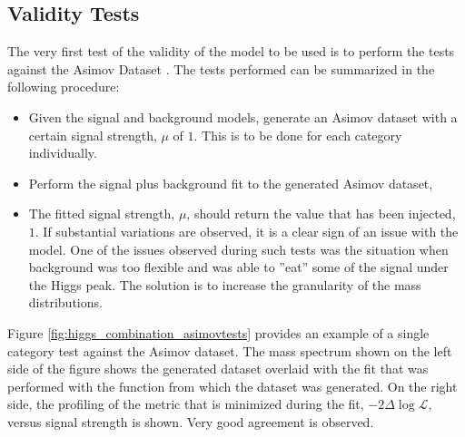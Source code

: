 \subsection{Validity Tests}
The very first test of the validity of the model to be used is to perform the
tests against the Asimov Dataset \cite{Asymptotic}. The tests performed can be summarized in the following procedure:
\begin{itemize}
    \item Given the signal and background models, generate an Asimov dataset with a certain signal strength, $\mu$ of $1$. This is to be done for each category individually.
    \item Perform the signal plus background fit to the generated Asimov dataset,
    \item The fitted signal strength, $\mu$, should return the value that has been injected, $1$. If substantial variations are observed, it is a clear sign of an issue with the model. One of the issues observed during such tests was the situation when background was too flexible and was able to ''eat'' some of the signal under the Higgs peak. The solution is to increase the granularity of the mass distributions.
\end{itemize}
Figure \ref{fig:higgs_combination_asimovtests} provides an example of a single category test against the Asimov dataset. The mass spectrum shown on the left side of the figure shows the generated dataset overlaid with the fit that was performed with the function from which the dataset was generated. On the right side, the profiling of the metric that is minimized during the fit, $-2\Delta\log{\mathcal{L}}$, versus signal strength is shown. Very good agreement is observed.

